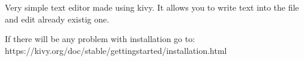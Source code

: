 Very simple text editor made using kivy. 
It allows you to write text into the file and edit already existig one. 


If there will be any problem with installation go to: https://kivy.org/doc/stable/gettingstarted/installation.html
